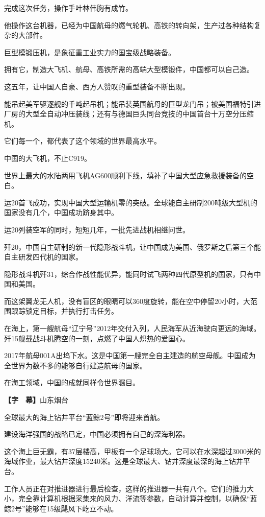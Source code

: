 \documentclass{ctexart}
\newcommand{\zkh}[1]{\textbf{\hspace{-2.7em} 【#1】}}
\begin{document}
 完成这次任务，操作手叶林伟胸有成竹。

他操作这台机器，已经为中国航母的燃气轮机、高铁的转向架，生产过各种结构复杂的大部件。

 巨型模锻压机，是象征重工业实力的国宝级战略装备。

 拥有它，制造大飞机、航母、高铁所需的高端大型模锻件，中国都可以自己造。

 这五年，让中国人自豪、西方人赞叹的重型装备不断出现。

能吊起美军驱逐舰的千吨起吊机；能吊装英国航母的巨型龙门吊；被美国福特引进厂房的大型全自动冲压装线；还有与德国巨头同台竞技的中国首台十万空分压缩机。

 它们每一个，都代表了这个领域的世界最高水平。

 中国的大飞机，不止C919。

 世界上最大的水陆两用飞机AG600顺利下线，填补了中国大型应急救援装备的空白。

运20首飞成功，实现中国大型运输机零的突破。全球能自主研制200吨级大型机的国家没有几个，中国成功跻身其中。

 运20列装空军的同时，短短几年，一批先进战机相继问世。

歼20，中国自主研制的新一代隐形战斗机，让中国成为美国、俄罗斯之后第三个能自主研发四代机的国家。

隐形战斗机歼31，综合作战性能优异，能同时试飞两种四代原型机的国家，只有中国和美国。

而这架翼龙无人机，没有盲区的眼睛可以360度旋转，能在空中停留20小时，大范围跟踪锁定目标，并执行打击任务。

在海上，第一艘航母``辽宁号''2012年交付入列，人民海军从近海驶向更远的海域。歼15舰载战斗机腾空的一刻，点燃了中国人炽热的爱国心。

2017年航母001A出坞下水。这是中国第一艘完全自主建造的航空母舰。中国成为全世界为数不多的能够自行建造航母的国家。

 在海工领域，中国的成就同样令世界瞩目。

 \zkh{字　幕}山东烟台

 全球最大的海上钻井平台``蓝鲸2号''即将迎来首航。

 建设海洋强国的战略已定，中国必须拥有自己的深海利器。

这个海上巨无霸，有37层楼高，甲板有一个足球场大。它可以在水深超过3000米的海域作业，最大钻井深度15240米。这是全球最大、钻井深度最深的海上钻井平台。

工作人员正在对推进器进行最后检查，这样的推进器一共有八个。它们的推力大小，完全靠计算机根据采集来的风力、洋流等参数，自动计算并控制，以确保``蓝鲸2号''能够在15级飓风下屹立不动。
\end{document}
